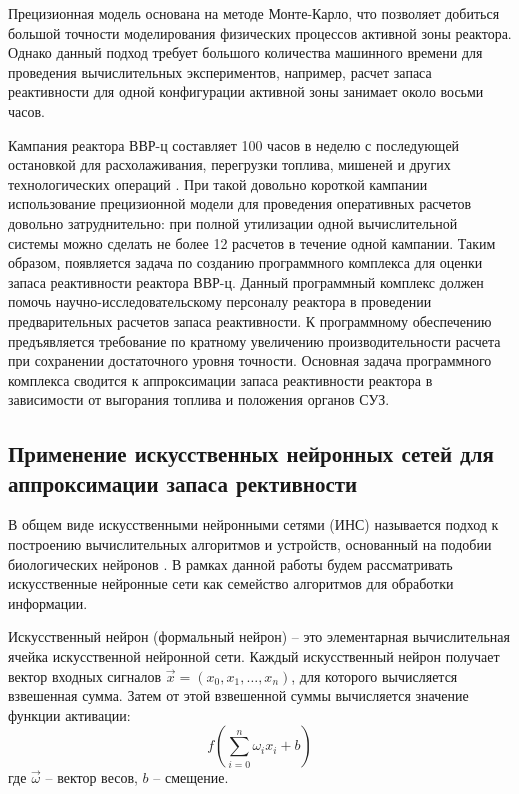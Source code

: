 Прецизионная модель основана на методе Монте-Карло, что позволяет добиться большой точности моделирования физических процессов активной зоны реактора. 
Однако данный подход требует большого количества машинного времени для проведения вычислительных экспериментов, например, расчет запаса реактивности для одной конфигурации активной зоны занимает около восьми часов.

Кампания реактора ВВР-ц составляет 100 часов в неделю с последующей остановкой для расхолаживания, перегрузки топлива, мишеней и других технологических операций \cite{wwrc-2014}.
При такой довольно короткой кампании использование прецизионной модели для проведения оперативных расчетов довольно затруднительно: при полной утилизации одной вычислительной системы можно сделать не более 12 расчетов в течение одной кампании.
Таким образом, появляется задача по созданию программного комплекса для оценки запаса реактивности реактора ВВР-ц.
Данный программный комплекс должен помочь научно-исследовательскому персоналу реактора в проведении предварительных расчетов запаса реактивности.
К программному обеспечению предъявляется требование по кратному увеличению производительности расчета при сохранении достаточного уровня точности.
Основная задача программного комплекса сводится к аппроксимации запаса реактивности реактора в зависимости от выгорания топлива и положения органов СУЗ.

\subsection{Применение искусственных нейронных сетей для аппроксимации запаса рективности}

В общем виде искусственными нейронными сетями (ИНС) называется подход к построению вычислительных алгоритмов и устройств, основанный на подобии биологических нейронов \cite{NejronnyeSeti}.
В рамках данной работы будем рассматривать искусственные нейронные сети как семейство алгоритмов для обработки информации.

Искусственный нейрон (формальный нейрон) -- это элементарная
вычислительная ячейка искусственной нейронной сети. Каждый искусственный
нейрон получает вектор входных сигналов $\vec x = (x_0, x_1, \ldots, x_n)$, для которого вычисляется взвешенная сумма.
Затем от этой взвешенной суммы вычисляется значение функции активации:
\begin{equation}
    f(\sum_{i=0}^{n} \omega_i x_i + b)
\end{equation}
где $\vec\omega$ -- вектор весов, $b$ -- смещение.

